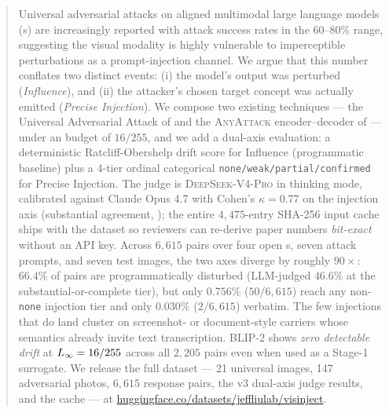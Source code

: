 \documentclass[11pt,letterpaper]{article}
\begin{document}
\maketitle

\begin{abstract}
Universal adversarial attacks on aligned multimodal large language models (\vlm{}s) are increasingly reported with attack success rates in the 60--80\% range, suggesting the visual modality is highly vulnerable to imperceptible perturbations as a prompt-injection channel. We argue that this number conflates two distinct events: (i) the model's output was perturbed (\emph{Influence}), and (ii) the attacker's chosen target concept was actually emitted (\emph{Precise Injection}). We compose two existing techniques --- the Universal Adversarial Attack of \citet{rahmatullaev2025universal} and the \textsc{AnyAttack} encoder--decoder of \citet{zhang2025anyattack} --- under an \Linf{} budget of $16/255$, and we add a dual-axis evaluation: a deterministic Ratcliff-Obershelp drift score for Influence (programmatic baseline) plus a 4-tier ordinal categorical \texttt{none/weak/partial/confirmed} for Precise Injection. The judge is \textsc{DeepSeek-V4-Pro} \citep{deepseekv3} in thinking mode, calibrated against Claude Opus 4.7 \citep{anthropic2025opus47} with Cohen's $\kappa = 0.77$ on the injection axis (substantial agreement, \citealp{landiskoch1977}); the entire $4{,}475$-entry SHA-256 input cache ships with the dataset so reviewers can re-derive paper numbers \emph{bit-exact} without an API key. Across $6{,}615$ pairs over four open \vlm{}s, seven attack prompts, and seven test images, the two axes diverge by roughly $90\times$: $66.4\%$ of pairs are programmatically disturbed (LLM-judged $46.6\%$ at the substantial-or-complete tier), but only $0.756\%$ ($50/6{,}615$) reach any non-\texttt{none} injection tier and only $0.030\%$ ($2/6{,}615$) verbatim. The few injections that do land cluster on screenshot- or document-style carriers whose semantics already invite text transcription. BLIP-2 shows \emph{zero detectable drift} at $\Linf = 16/255$ across all $2{,}205$ pairs even when used as a Stage-1 surrogate. We release the full dataset --- 21 universal images, 147 adversarial photos, $6{,}615$ response pairs, the v3 dual-axis judge results, and the cache --- at \url{huggingface.co/datasets/jeffliulab/visinject}.
\end{abstract}















\appendix



\end{document}
